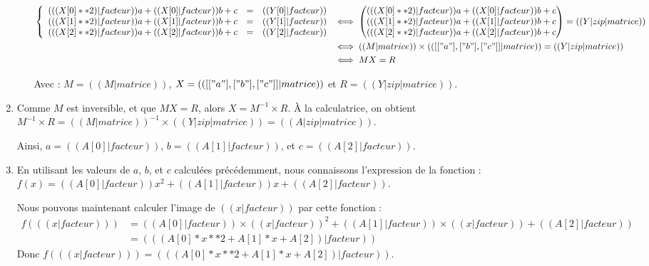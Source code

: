 \begin{enumerate}
\begin{enumerate}
\begin{align*}
        \left\{\begin{array}{rcl}
            (( (X[0]**2)|facteur ))a + (( X[0]|facteur ))b + c &=& (( Y[0]|facteur )) \\
            (( (X[1]**2)|facteur ))a + (( X[1]|facteur ))b + c &=& (( Y[1]|facteur )) \\
            (( (X[2]**2)|facteur ))a + (( X[2]|facteur ))b + c &=& (( Y[2]|facteur )) \\
        \end{array}\right.
&\iff
\begin{pmatrix}
(( (X[0]**2)|facteur ))a + (( X[0]|facteur ))b + c \\
(( (X[1]**2)|facteur ))a + (( X[1]|facteur ))b + c \\
(( (X[2]**2)|facteur ))a + (( X[2]|facteur ))b + c \\
\end{pmatrix} = (( Y|zip|matrice ))\\
&\iff
(( M|matrice)) \times (( [["a"], ["b"], ["c"]]|matrice )) = (( Y|zip|matrice )) \\
&\iff M X=R
\end{align*}

        Avec : $M= (( M|matrice ))$, $X= (( [["a"], ["b"], ["c"]]|matrice ))$ et $R= (( Y|zip|matrice ))$.
    \end{enumerate}
  \item
    Comme $M$ est inversible, et que $MX = R$, alors $X = M^{-1}\times R$. À la calculatrice, on obtient
$M^{-1}\times R=(( M|matrice ))^{-1}\times ((Y|zip|matrice)) = (( A|zip|matrice ))$.

    Ainsi, $a=(( A[0]|facteur ))$, $b=(( A[1]|facteur ))$, et $c=(( A[2]|facteur ))$.
  \item
En utilisant les valeurs de $a$, $b$, et $c$ calculées précédemment, nous connaissons l'expression de la fonction : $f(x) = (( A[0]|facteur ))x^2 + (( A[1]|facteur))x + (( A[2]|facteur ))$.

Nous pouvons maintenant calculer l'image de $(( x|facteur ))$ par cette fonction :
\begin{align*}
f( (( x|facteur )) )
&= (( A[0]|facteur )) \times (( x|facteur ))^2 + (( A[1]|facteur )) \times (( x|facteur)) + (( A[2]|facteur ))\\
&= (( (A[0]*x**2+A[1]*x+A[2])|facteur ))
\end{align*}
Donc $f( (( x|facteur )) ) = (( (A[0]*x**2+A[1]*x+A[2])|facteur ))$.
\end{enumerate}

